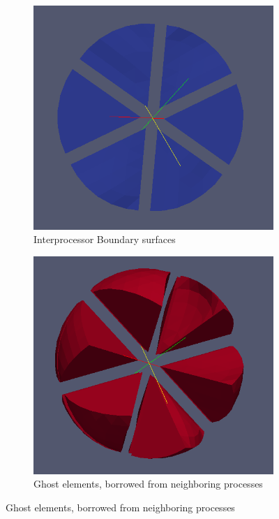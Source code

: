 \begin{figure}
	\begin{subfigure}[b]{0.33\textwidth} \hspace{4mm} \includegraphics[scale=0.22]{images/32-pb}    \captionsetup{width=0.8\textwidth} \caption{ Interprocessor Boundary surfaces} \end{subfigure}
	\begin{subfigure}[b]{0.46\textwidth} \vspace{5mm} \hspace{12mm} \includegraphics[scale=0.25]{images/32-ghost} \captionsetup{width=0.6\textwidth} \caption{ Ghost elements, borrowed from neighboring processes} \end{subfigure}

\end{figure}
